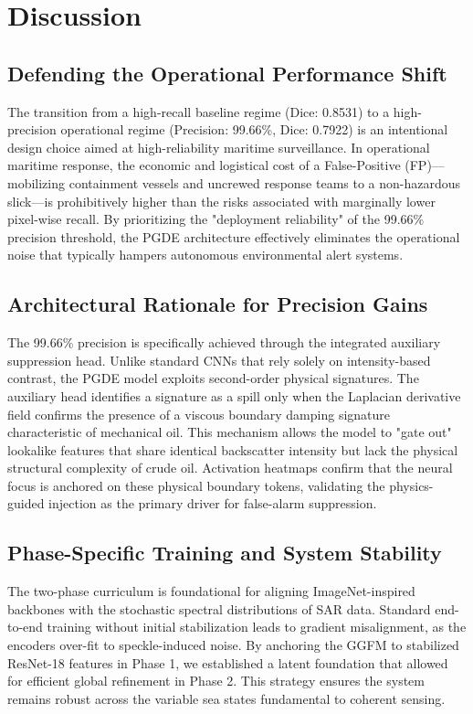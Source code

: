 \section{Discussion}
\subsection{Defending the Operational Performance Shift}
The transition from a high-recall baseline regime (Dice: 0.8531) to a high-precision operational regime (Precision: 99.66\%, Dice: 0.7922) is an intentional design choice aimed at high-reliability maritime surveillance. In operational maritime response, the economic and logistical cost of a False-Positive (FP)—mobilizing containment vessels and uncrewed response teams to a non-hazardous slick—is prohibitively higher than the risks associated with marginally lower pixel-wise recall. By prioritizing the "deployment reliability" of the 99.66\% precision threshold, the PGDE architecture effectively eliminates the operational noise that typically hampers autonomous environmental alert systems.

\subsection{Architectural Rationale for Precision Gains}
The 99.66\% precision is specifically achieved through the integrated auxiliary suppression head. Unlike standard CNNs that rely solely on intensity-based contrast, the PGDE model exploits second-order physical signatures. The auxiliary head identifies a signature as a spill only when the Laplacian derivative field confirms the presence of a viscous boundary damping signature characteristic of mechanical oil. This mechanism allows the model to "gate out" lookalike features that share identical backscatter intensity but lack the physical structural complexity of crude oil. Activation heatmaps confirm that the neural focus is anchored on these physical boundary tokens, validating the physics-guided injection as the primary driver for false-alarm suppression.

\subsection{Phase-Specific Training and System Stability}
The two-phase curriculum is foundational for aligning ImageNet-inspired backbones with the stochastic spectral distributions of SAR data. Standard end-to-end training without initial stabilization leads to gradient misalignment, as the encoders over-fit to speckle-induced noise. By anchoring the GGFM to stabilized ResNet-18 features in Phase 1, we established a latent foundation that allowed for efficient global refinement in Phase 2. This strategy ensures the system remains robust across the variable sea states fundamental to coherent sensing.

